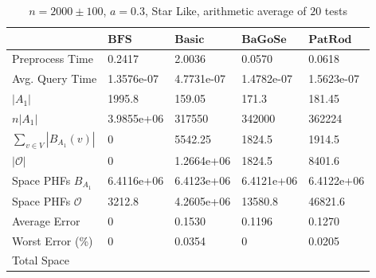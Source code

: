 \documentclass[shortabstract, lic, english]{iithesis}
\theoremstyle{definition} \newtheorem{definition}{Definition}[chapter]
\theoremstyle{plain} \newtheorem{remark}[definition]{Observation}
\theoremstyle{plain} \newtheorem{theorem}[definition]{Theorem}
\theoremstyle{plain} \newtheorem{lemma}[definition]{Lemma}
\theoremstyle{plain} \newtheorem{conjecture}[definition]{Conjecture}
\begin{document}
\begin{table}[H]
    \centering
    \begin{tabular}{ |p{3cm}||p{2cm}|p{2cm}|p{2cm}|p{2cm}|  } 
        \hline
        & $\mathbf{BFS}$ & $\mathbf{Basic}$ & $\mathbf{BaGoSe}$ & $\mathbf{PatRod}$ \\
        \hline
        \hline
        Preprocess Time                 & 0.2417     & 2.0036     & 0.0570      & 0.0618     \\
        \hline
        Avg. Query Time                 & 1.3576e-07 & 4.7731e-07 & 1.4782e-07  & 1.5623e-07 \\
        \hline
        $|A_1|$                         & 1995.8     & 159.05     & 171.3       & 181.45      \\
        \hline
        $n  |A_1|$                     & 3.9855e+06 & 317550     & 342000      & 362224     \\
        \hline
        $\sum_{v \in V} |B_{A_1}(v)| $  & 0          & 5542.25    & 1824.5      & 1914.5     \\
        \hline
        $|\mathcal{O}|$                 & 0          & 1.2664e+06 & 1824.5      & 8401.6     \\
        \hline
        Space PHFs $B_{A_1}$            & 6.4116e+06 & 6.4123e+06 & 6.4121e+06  & 6.4122e+06 \\
        \hline
        Space PHFs $\mathcal{O}$        & 3212.8     & 4.2605e+06 & 13580.8     & 46821.6     \\
        \hline
        Average Error                   & 0          & 0.1530     & 0.1196      & 0.1270     \\
        \hline
        Worst Error (\%)                & 0          & 0.0354     & 0           & 0.0205     \\
        \hline
        Total Space                     &            &            &             &            \\
        \hline

    \end{tabular}
    \caption{$n = 2000 \pm 100$, $a = 0.3$, Star Like, arithmetic average of $20$ tests}
\end{table}
\end{document}
